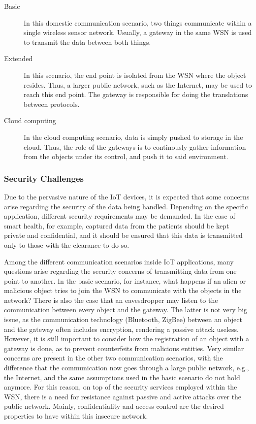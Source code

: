 \documentclass[12pt]{article}
\begin{document}
\begin{description}
\item[Basic] In this domestic communication scenario, two things communicate within a single wireless sensor network. Usually, a gateway in the same WSN is used to transmit the data between both things.
\item[Extended] In this scenario, the end point is isolated from the WSN where the object resides. Thus, a larger public network, such as the Internet, may be used to reach this end point. The gateway is responsible for doing the translations between protocols.
\item[Cloud computing] In the cloud computing scenario, data is simply pushed to storage in the cloud. Thus, the role of the gateways is to continously gather information from the objects under its control, and push it to said environment.
\end{description} 

\subsubsection{Security Challenges}

Due to the pervasive nature of the IoT devices, it is expected that some concerns arise regarding the security of the data being handled. Depending on the specific application, different security requirements may be demanded. In the case of smart health, for example, captured data from the patients should be kept private and confidential, and it should be ensured that this data is transmitted only to those with the clearance to do so.

Among the different communication scenarios inside IoT applications, many questions arise regarding the security concerns of transmitting data from one point to another. In the basic scenario, for instance, what happens if an alien or malicious object tries to join the WSN to communicate with the objects in the network? There is also the case that an eavesdropper may listen to the communication between every object and the gateway. The latter is not very big issue, as the communication technology (Bluetooth, ZigBee) between an object and the gateway often includes encryption, rendering a passive attack useless. However, it is still important to consider how the registration of an object with a gateway is done, as to prevent counterfeits from malicious entities. Very similar concerns are present in the other two communication scenarios, with the difference that the communication now goes through a large public network, e.g., the Internet, and the same assumptions used in the basic scenario do not hold anymore. For this reason, on top of the security services employed within the WSN, there is a need for resistance against passive and active attacks over the public network. Mainly, confidentiality and access control are the desired properties to have within this insecure network.
\end{document}
